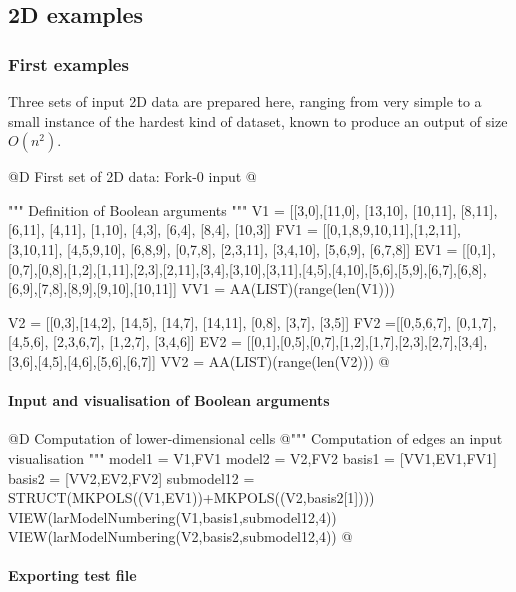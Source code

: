 \documentclass[11pt,oneside]{article}	%
\begin{document}
\subsection{2D examples}

\subsubsection{First examples}

Three sets of input 2D data are prepared here, ranging from very simple to a small instance of the hardest kind of dataset, known to produce an output of size $O(n^2)$.


@D First set of 2D data: Fork-0 input
@{""" Definition of Boolean arguments """
V1 = [[3,0],[11,0], [13,10], [10,11], [8,11], [6,11], [4,11], [1,10], [4,3], [6,4], 
	[8,4], [10,3]]
FV1 = [[0,1,8,9,10,11],[1,2,11], [3,10,11], [4,5,9,10], [6,8,9], [0,7,8], [2,3,11],
	[3,4,10], [5,6,9], [6,7,8]]
EV1 = [[0,1],[0,7],[0,8],[1,2],[1,11],[2,3],[2,11],[3,4],[3,10],[3,11],[4,5],[4,10],[5,6],[5,9],[6,7],[6,8],[6,9],[7,8],[8,9],[9,10],[10,11]]
VV1 = AA(LIST)(range(len(V1)))

V2 = [[0,3],[14,2], [14,5], [14,7], [14,11], [0,8], [3,7], [3,5]]
FV2 =[[0,5,6,7], [0,1,7], [4,5,6], [2,3,6,7], [1,2,7], [3,4,6]]
EV2 = [[0,1],[0,5],[0,7],[1,2],[1,7],[2,3],[2,7],[3,4],[3,6],[4,5],[4,6],[5,6],[6,7]]
VV2 = AA(LIST)(range(len(V2)))
@}


\paragraph{Input and visualisation of Boolean arguments}

@D Computation of lower-dimensional cells
@{""" Computation of edges an input visualisation """
model1 = V1,FV1
model2 = V2,FV2
basis1 = [VV1,EV1,FV1]
basis2 = [VV2,EV2,FV2]
submodel12 = STRUCT(MKPOLS((V1,EV1))+MKPOLS((V2,basis2[1])))
VIEW(larModelNumbering(V1,basis1,submodel12,4))
VIEW(larModelNumbering(V2,basis2,submodel12,4))
@}

\paragraph{Exporting test file}
\end{document}
